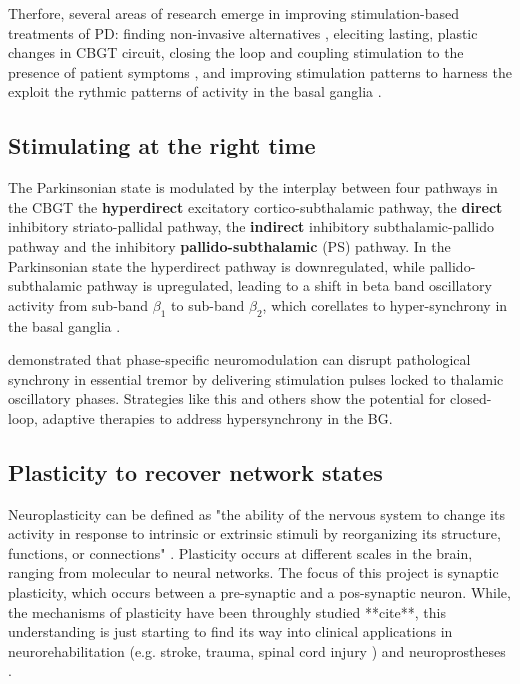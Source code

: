 Therfore, several areas of research emerge in improving stimulation-based treatments of PD:
finding non-invasive alternatives \cite{saturnino2017target, schwab2020spike}, eleciting lasting,
plastic changes in CBGT circuit, closing the loop and coupling stimulation to the presence of
patient symptoms \cite{beudel2018adaptive}, and improving stimulation patterns to harness the
exploit the rythmic patterns of activity in the basal ganglia \cite{cagnan2017stimulating, west2022stimulating}.

\subsection{Stimulating at the right time}
The Parkinsonian state is modulated by the interplay between four pathways in the CBGT
the \textbf{hyperdirect} excitatory cortico-subthalamic pathway,
the \textbf{direct} inhibitory striato-pallidal pathway,
the \textbf{indirect} inhibitory subthalamic-pallido pathway and
the inhibitory \textbf{pallido-subthalamic} (PS) pathway. In the Parkinsonian state the hyperdirect
pathway is downregulated, while pallido-subthalamic pathway is upregulated, leading to a shift in
beta band oscillatory activity from sub-band $\beta_1$ to sub-band $\beta_2$, which corellates to
hyper-synchrony in the basal ganglia \cite{west2022stimulating}.

\cite{cagnan2017stimulating} demonstrated that phase-specific neuromodulation can disrupt pathological
synchrony in essential tremor by delivering stimulation pulses locked to thalamic oscillatory phases.
Strategies like this and others \cite{beudel2018adaptive} show the potential for closed-loop,
adaptive therapies to address hypersynchrony in the BG.

\subsection{Plasticity to recover network states}
Neuroplasticity can be defined as "the ability of the nervous system to change its activity in
response to intrinsic or extrinsic stimuli by reorganizing its structure, functions, or
connections" \cite{mateos2019impact}.
Plasticity occurs at different scales in the brain, ranging from molecular to neural networks.
The focus of this project is synaptic plasticity, which occurs between a pre-synaptic and a
pos-synaptic neuron. While, the mechanisms of plasticity have been throughly studied **cite**,
this understanding is just starting to find its way into clinical applications in
neurorehabilitation (e.g. stroke, trauma, spinal cord injury \cite{cramer2011harnessing}) and
neuroprostheses \cite{lebedev2017brain}.

